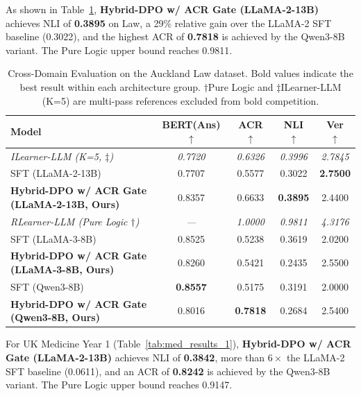 As shown in Table~\ref{tab:law_results}, \textbf{Hybrid-DPO w/ ACR Gate (LLaMA-2-13B)} achieves NLI of \textbf{0.3895} on Law, a 29\% relative gain over the LLaMA-2 SFT baseline (0.3022), and the highest ACR of \textbf{0.7818} is achieved by the Qwen3-8B variant. The Pure Logic upper bound reaches 0.9811.

\begin{table}[h]
\centering
\small
\begin{tabular}{l|c|c|c|c}
\toprule
Model & BERT(Ans) $\uparrow$ & ACR $\uparrow$ & NLI $\uparrow$ & Ver $\uparrow$ \\
\midrule
\textit{ILearner-LLM (K=5, $\ddagger$)} & \textit{0.7720} & \textit{0.6326} & \textit{0.3996} & \textit{2.7845} \\
\midrule
SFT (LLaMA-2-13B) & 0.7707 & 0.5577 & 0.3022 & \textbf{2.7500} \\
\textbf{Hybrid-DPO w/ ACR Gate (LLaMA-2-13B, Ours)} & 0.8357 & 0.6633 & \textbf{0.3895} & 2.4400 \\
\textit{RLearner-LLM (Pure Logic $\dagger$)} & \textit{---} & \textit{1.0000} & \textit{0.9811} & \textit{4.3176} \\
\midrule
SFT (LLaMA-3-8B) & 0.8525 & 0.5238 & 0.3619 & 2.0200 \\
\textbf{Hybrid-DPO w/ ACR Gate (LLaMA-3-8B, Ours)} & 0.8260 & 0.5421 & 0.2435 & 2.5500 \\
\midrule
SFT (Qwen3-8B) & \textbf{0.8557} & 0.5175 & 0.3191 & 2.0000 \\
\textbf{Hybrid-DPO w/ ACR Gate (Qwen3-8B, Ours)} & 0.8016 & \textbf{0.7818} & 0.2684 & 2.5400 \\
\bottomrule
\end{tabular}
\caption{Cross-Domain Evaluation on the Auckland Law dataset. Bold values indicate the best result within each architecture group. $\dagger$Pure Logic and $\ddagger$ILearner-LLM (K=5) are multi-pass references excluded from bold competition.}
\label{tab:law_results}
\end{table}

For UK Medicine Year 1 (Table~\ref{tab:med_results_1}), \textbf{Hybrid-DPO w/ ACR Gate (LLaMA-2-13B)} achieves NLI of \textbf{0.3842}, more than $6\times$ the LLaMA-2 SFT baseline (0.0611), and an ACR of \textbf{0.8242} is achieved by the Qwen3-8B variant. The Pure Logic upper bound reaches 0.9147.

